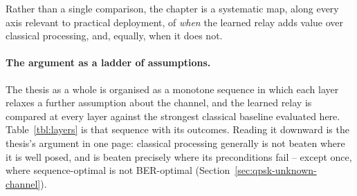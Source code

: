 Rather than a single comparison, the chapter is a systematic map, along every axis relevant to practical deployment, of \emph{when} the learned relay adds value over classical processing, and, equally, when it does not.

\paragraph{The argument as a ladder of assumptions.} The thesis as a whole is organised as a monotone sequence in which each layer relaxes a further assumption about the channel, and the learned relay is compared at every layer against the strongest classical baseline evaluated here. Table~\ref{tbl:layers} is that sequence with its outcomes. Reading it downward is the thesis's argument in one page: classical processing generally is not beaten where it is well posed, and is beaten precisely where its preconditions fail -- except once, where sequence-optimal is not BER-optimal (Section~\ref{sec:qpsk-unknown-channel}).

